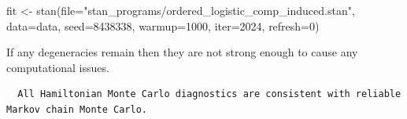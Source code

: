 \documentclass[
  letterpaper,
  DIV=11,
  numbers=noendperiod]{scrartcl}
\newenvironment{Shaded}{\begin{snugshade}}{\end{snugshade}}
\newcommand{\AttributeTok}[1]{\textcolor[rgb]{0.40,0.45,0.13}{#1}}
\newcommand{\ConstantTok}[1]{\textcolor[rgb]{0.56,0.35,0.01}{#1}}
\newcommand{\DecValTok}[1]{\textcolor[rgb]{0.68,0.00,0.00}{#1}}
\newcommand{\FunctionTok}[1]{\textcolor[rgb]{0.28,0.35,0.67}{#1}}
\newcommand{\NormalTok}[1]{\textcolor[rgb]{0.00,0.23,0.31}{#1}}
\newcommand{\OtherTok}[1]{\textcolor[rgb]{0.00,0.23,0.31}{#1}}
\newcommand{\SpecialCharTok}[1]{\textcolor[rgb]{0.37,0.37,0.37}{#1}}
\newcommand{\StringTok}[1]{\textcolor[rgb]{0.13,0.47,0.30}{#1}}
\begin{document}
\begin{Shaded}
\begin{Highlighting}[]
\NormalTok{fit }\OtherTok{\textless{}{-}} \FunctionTok{stan}\NormalTok{(}\AttributeTok{file=}\StringTok{"stan\_programs/ordered\_logistic\_comp\_induced.stan"}\NormalTok{,}
            \AttributeTok{data=}\NormalTok{data, }\AttributeTok{seed=}\DecValTok{8438338}\NormalTok{,}
            \AttributeTok{warmup=}\DecValTok{1000}\NormalTok{, }\AttributeTok{iter=}\DecValTok{2024}\NormalTok{, }\AttributeTok{refresh=}\DecValTok{0}\NormalTok{)}
\end{Highlighting}
\end{Shaded}

If any degeneracies remain then they are not strong enough to cause any
computational issues.

\begin{Shaded}
\end{Shaded}

\begin{verbatim}
  All Hamiltonian Monte Carlo diagnostics are consistent with reliable
Markov chain Monte Carlo.
\end{verbatim}

\begin{Shaded}
\end{Shaded}
\end{document}
